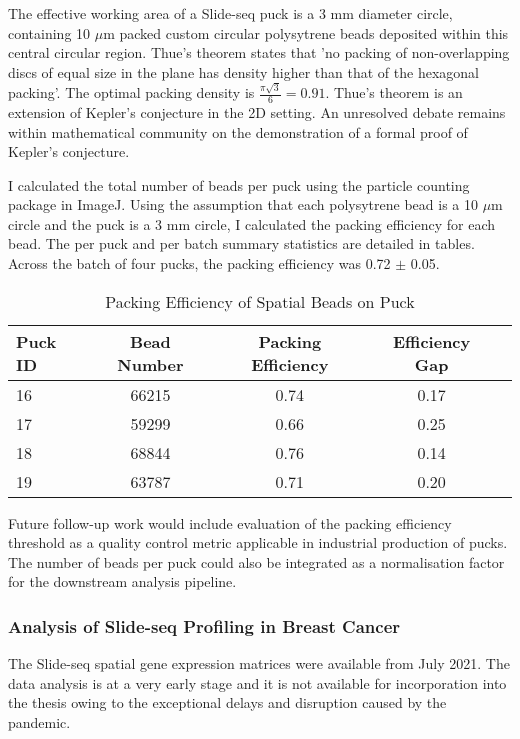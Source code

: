 The effective working area of a Slide-seq puck is a 3 mm diameter circle, containing 10 $\mu$m packed custom circular polysytrene beads deposited within this central circular region. Thue's theorem states that 'no packing of non-overlapping discs of equal size in the plane has density higher than that of the hexagonal packing'. The optimal packing density is $\frac{\pi \sqrt{3}}{6} = 0.91$. Thue's theorem is an extension of Kepler's conjecture in the 2D setting. An unresolved debate remains within mathematical community on the demonstration of a formal proof of Kepler's conjecture.

I calculated the total number of beads per puck using the particle counting package in ImageJ. Using the assumption that each polysytrene bead is a 10 $\mu$m circle and the puck is a 3 mm circle, I calculated the packing efficiency for each bead. The per puck and per batch summary statistics are detailed in tables. Across the batch of four pucks, the packing efficiency was 0.72 $\pm$ 0.05.

\begin{table}[ht]
	\centering
	\small
	\renewcommand{\arraystretch}{1.4}
	\begin{tabular}{|l| c | c | c | c |}
		\hline
		Puck ID	&  Bead Number & Packing Efficiency & Efficiency Gap  \\
		\hline
		16 	& 66215 & 0.74 & 0.17  		\\
		
		17 	& 59299 & 0.66 & 0.25  		\\
		
		18 	& 68844 & 0.76 & 0.14 		\\
		
		19 	& 63787 & 0.71 & 0.20 		\\
		\hline
	\end{tabular}
	\caption{Packing Efficiency of Spatial Beads on Puck}
	\label{tab: puck_bead_packing_efficiency}
\end{table}


Future follow-up work would include evaluation of the packing efficiency threshold as a quality control metric applicable in industrial production of pucks. The number of beads per puck could also be integrated as a normalisation factor for the downstream analysis pipeline.

\subsubsection{Analysis of Slide-seq Profiling in Breast Cancer}
The Slide-seq spatial gene expression matrices were available from July 2021. The data analysis is at a very early stage and it is not available for incorporation into the thesis owing to the exceptional delays and disruption caused by the pandemic. 

